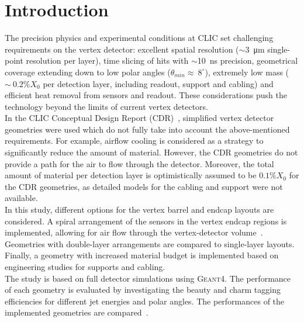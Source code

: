 \section{Introduction}\label{sec:Introduction}

The precision physics and experimental conditions at CLIC set challenging requirements on the vertex detector: excellent spatial resolution ($\sim$\SI{3}{\micro\meter} single-point resolution per layer), time slicing of hits with $\sim$\SI{10}{\nano\second} precision, geometrical coverage extending down to low polar angles ($\theta_{min}\approx~8^{\circ}$), extremely low mass ($\sim~0.2\%X_{0}$ per detection layer, including readout, support and cabling) and efficient heat removal from sensors and readout. These considerations push the technology beyond the limits of current vertex detectors. \\
In the CLIC Conceptual Design Report (CDR)~\cite{CLICCDR2012}, simplified vertex detector geometries were used which do not fully take into account the above-mentioned requirements. For example, airflow cooling is considered as a strategy to significantly reduce the amount of material. However, the CDR geometries do not provide a path for the air to flow through the detector. Moreover, the total amount of material per detection layer is optimistically assumed to be $0.1\%X_{0}$ for the CDR geometries, as detailed models for the cabling and support were not available. \\
In this study, different options for the vertex barrel and endcap layouts are considered. A spiral arrangement of the sensors in the vertex endcap regions is implemented, allowing for air flow through the vertex-detector volume~\cite{CoolingSimulations}. Geometries with double-layer arrangements are compared to single-layer layouts. Finally, a geometry with increased material budget is implemented based on engineering studies for supports and cabling. \\
The study is based on full detector simulations using \textsc{Geant4}. The performance of each geometry is evaluated by investigating the beauty and charm tagging efficiencies for different jet energies and polar angles. The performances of the implemented geometries are compared~\cite{AlipourTehrani:1606436}.
